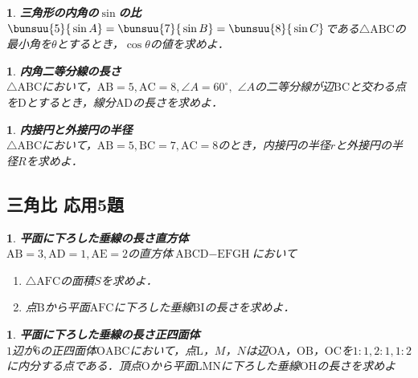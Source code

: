 \documentclass[10pt,
fleqn,
dvipdfmx,
uplatex
]{jsarticle}
\newtheorem{question}[Question]{}
\begin{document}
\begin{question}{\bf\boldmath 三角形の内角の$\sin$の比}\\
$\bunsuu{5}{{}\sin A}=\bunsuu{7}{{}\sin B}=\bunsuu{8}{{}\sin C}$である$\triangle \text{ABC}$の最小角を$\theta$とするとき，$\cos \theta$の値を求めよ．
\end{question}



\begin{question}{\bf\boldmath 内角二等分線の長さ}\\
$\triangle \text{ABC}$において，$\text{AB}=5, \text{AC}=8, \angle A={60}^\circ ,$
$\angle A$の二等分線が辺$\text{BC}$と交わる点を$\text{D}$とするとき，線分$\text{AD}$の長さを求めよ．
\end{question}



\begin{question}{\bf\boldmath 内接円と外接円の半径}\\
$\triangle \text{ABC}$において，$\text{AB}=5, \text{BC}=7, \text{AC}=8$のとき，内接円の半径$r$と外接円の半径$R$を求めよ．
\end{question}

\subsection{三角比 応用5題}



\begin{question}{\bf\boldmath 平面に下ろした垂線の長さ直方体}\\
$\text{AB}=3, \text{AD}=1, \text{AE}=2$の直方体$\text{ABCD}-\text{EFGH}$において
\begin{enumerate}
\item $\triangle \text{AFC}$の面積$S$を求めよ．
\item 点$\text{B}$から平面$\text{AFC}$に下ろした垂線$\text{BI}$の長さを求めよ．
\end{enumerate}

\end{question}



\begin{question}{\bf\boldmath 平面に下ろした垂線の長さ正四面体}\\
$1$辺が$6$の正四面体$\text{OABC}$において，点$\text{L}$，$M$，$N$は辺$\text{OA}$，$\text{OB}$，$\text{OC}$を$1:1, 2:1, 1:2$に内分する点である．頂点$\text{O}$から平面$\text{LMN}$に下ろした垂線$\text{OH}$の長さを求めよ
\end{question}
\end{document}
